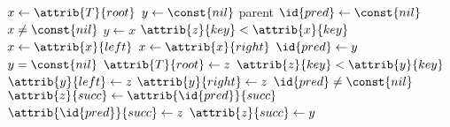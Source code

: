 \begin{codebox}
\li $x \gets \attrib{T}{root}$
\li $y \gets \const{nil}$ \Comment parent
\li $\id{pred} \gets \const{nil}$
\li \While $x \neq \const{nil}$
\li \Do
        $y \gets x$
\li     \If $\attrib{z}{key} < \attrib{x}{key}$
\li     \Then
            $x \gets \attrib{x}{left}$
\li     \Else
\li         $x \gets \attrib{x}{right}$
\li         $\id{pred} \gets y$
        \End
    \End
\li \If $y = \const{nil}$
\li \Then
        $\attrib{T}{root} \gets z$
\li \Else \If $\attrib{z}{key} < \attrib{y}{key}$
\li     $\attrib{y}{left} \gets z$
\li \Else
\li     $\attrib{y}{right} \gets z$
    \End
\li \If $\id{pred} \neq \const{nil}$
\li \Then
        $\attrib{z}{succ} \gets \attrib{\id{pred}}{succ}$
\li     $\attrib{\id{pred}}{succ} \gets z$
\li \Else
\li     $\attrib{z}{succ} \gets y$
    \End
\end{codebox}